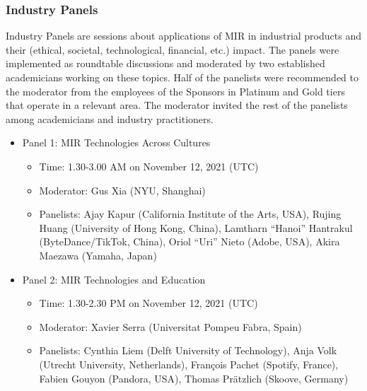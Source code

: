 \documentclass[%
10pt,								%
]
{scrartcl}
\begin{document}
        \subsubsection{Industry Panels}
            Industry Panels are sessions about applications of MIR in industrial products and their (ethical, societal, technological, financial, etc.) impact. The panels were implemented as roundtable discussions and moderated by two established academicians working on these topics. Half of the panelists were recommended to the moderator from the employees of the Sponsors in Platinum and Gold tiers that operate in a relevant area. The moderator invited the rest of the panelists among academicians and industry practitioners.
            \begin{itemize}
                \item Panel 1: MIR Technologies Across Cultures
                    \begin{itemize}
                        \item Time: 1.30-3.00 AM on November 12, 2021 (UTC)
                        \item   Moderator: Gus Xia (NYU, Shanghai)
                        \item   Panelists: Ajay Kapur (California Institute of the Arts, USA), Rujing Huang (University of Hong Kong, China), Lamtharn “Hanoi” Hantrakul (ByteDance/TikTok, China), Oriol “Uri” Nieto (Adobe, USA), Akira Maezawa (Yamaha, Japan)
                    \end{itemize}
                \item Panel 2: MIR Technologies and Education
                    \begin{itemize}
                        \item Time: 1.30-2.30 PM on November 12, 2021 (UTC)
                        \item  Moderator: Xavier Serra (Universitat Pompeu Fabra, Spain)
                        \item  Panelists: Cynthia Liem (Delft University of Technology), Anja Volk (Utrecht University, Netherlands), François Pachet (Spotify, France), Fabien Gouyon (Pandora, USA), Thomas Prätzlich (Skoove, Germany) 
                    \end{itemize}
            \end{itemize}
\end{document}
